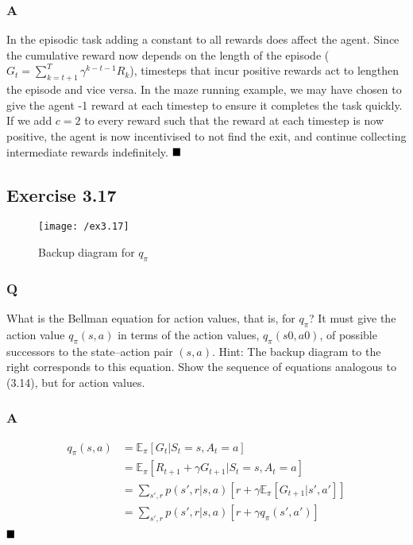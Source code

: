 \subsubsection*{A}
In the episodic task adding a constant to all rewards does affect the agent. Since the cumulative reward now depends on the length of the episode ($G_t = \sum_{k=t+1}^{T} \gamma^{k-t-1}R_k $), timesteps that incur positive rewards act to lengthen the episode and vice versa. In the maze running example, we may have chosen to give the agent -1 reward at each timestep to ensure it completes the task quickly. If we add $c=2$ to every reward such that the reward at each timestep is now positive, the agent is now incentivised to not find the exit, and continue collecting intermediate rewards indefinitely. 
$
\hfill \blacksquare
$

\subsection{Exercise 3.17}
\begin{figure}[h!]
	\centering
	\texttt{[image: /ex3.17]}
	\caption{Backup diagram for $q_\pi$}
	\label{fig:3.17}
\end{figure}
\subsubsection*{Q}
What is the Bellman equation for action values, that is, for $q_\pi$? It must give the action value $q_\pi(s, a)$ in terms of the action values, $q_\pi(s0, a0)$, of possible successors to the state–action pair $(s, a)$. Hint: The backup diagram to the right corresponds to this equation. Show the sequence of equations analogous to (3.14), but for action values.

\subsubsection*{A}
\begin{align}
q_\pi(s,a) &= \mathbb{E}_\pi[G_t | S_t = s, A_t = a] \\
&= \mathbb{E}_\pi[R_{t+1} + \gamma G_{t+1} | S_t = s, A_t = a] \\
&= \sum_{s', r} p(s', r | s, a) [r + \gamma \mathbb{E}_\pi[G_{t+1} | s', a']] \\
&= \sum_{s', r} p(s', r | s, a) [r + \gamma q_\pi(s', a')] \\
\end{align}
$
\hfill \blacksquare
$

